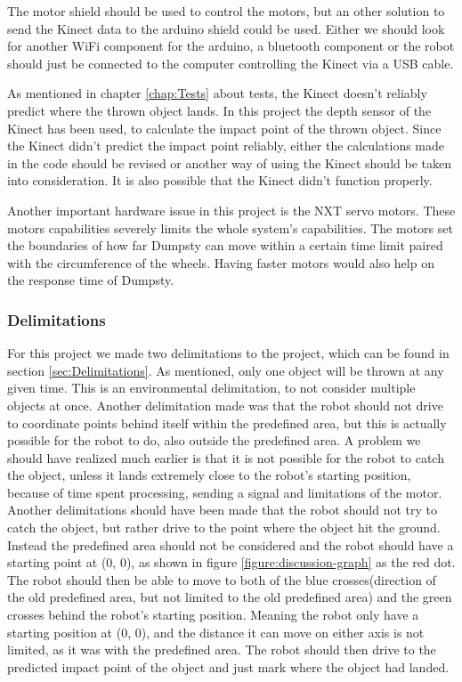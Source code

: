 The motor shield should be used to control the motors, but an other solution to send the Kinect data to the arduino shield could be used. Either we should look for another WiFi component for the arduino, a bluetooth component or the robot should just be connected to the computer controlling the Kinect via a USB cable. 

As mentioned in chapter \ref{chap:Tests} about tests, the Kinect doesn’t reliably predict where the thrown object lands. In this project the depth sensor of the Kinect has been used, to calculate the impact point of the thrown object. Since the Kinect didn’t predict the impact point reliably, either the calculations made in the code should be revised or another way of using the Kinect should be taken into consideration. It is also possible that the Kinect didn’t function properly. 

Another important hardware issue in this project is the NXT servo motors. These motors capabilities severely limits the whole system’s capabilities. The motors set the boundaries of how far Dumpsty can move within a certain time limit paired with the circumference of the wheels. Having faster motors would also help on the response time of Dumpsty.


\subsubsection{Delimitations}
For this project we made two delimitations to the project, which can be found in section \ref{sec:Delimitations}. As mentioned, only one object will be thrown at any given time. This is an environmental delimitation, to not consider multiple objects at once. \newline
Another delimitation made was that the robot should not drive to coordinate points behind itself within the predefined area, but this is actually possible for the robot to do, also outside the predefined area. A problem we should have realized much earlier is that it is not possible for the robot to catch the object, unless it lands extremely close to the robot’s starting position, because of time spent processing, sending a signal and limitations of the motor. Another delimitations should have been made that the robot should not try to catch the object, but rather drive to the point where the object hit the ground. \newline
Instead the predefined area should not be considered and the robot should have a starting point at (0, 0), as shown in figure \ref{figure:discussion-graph} as the red dot. The robot should then be able to move to both of the blue crosses(direction of the old predefined area, but not limited to the old predefined area) and the green crosses behind the robot’s starting position. Meaning the robot only have a starting position at (0, 0), and the distance it can move on either axis is not limited, as it was with the predefined area. The robot should then drive to the predicted impact point of the object and just mark where the object had landed.



